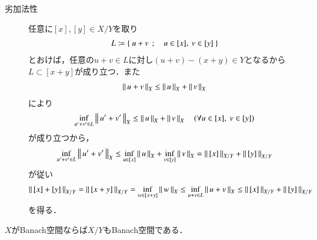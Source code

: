 \begin{prf}
\begin{description}
			\item[劣加法性]
				任意に$[x],[y] \in X/Y$を取り
				\begin{align}
					L \coloneqq \left\{\ u + v\ \, ; \quad u \in [x],\ v \in [y]\ \right\}
				\end{align}
				とおけば，任意の$u+v \in L$に対し$(u+v) - (x+y) \in Y$となるから$L \subset [x+y]$が成り立つ．また
				\begin{align}
					\left\|\, u + v\, \right\|_{X} \leq \left\|\, u\, \right\|_{X} + \left\|\, v\, \right\|_{X}
				\end{align}
				により
				\begin{align}
					\operatorname*{inf}_{u'+v' \in L} \left\|\, u' + v'\, \right\|_{X} \leq \left\|\, u\, \right\|_{X} + \left\|\, v\, \right\|_{X} \quad (\forall u \in [x],\ v \in [y])
				\end{align}
				が成り立つから，
				\begin{align}
					\operatorname*{inf}_{u'+v' \in L} \left\|\, u' + v'\, \right\|_{X} 
					\leq \operatorname*{inf}_{u \in [x]} \left\|\, u\, \right\|_{X} + \operatorname*{inf}_{v \in [y]} \left\|\, v\, \right\|_{X}
					= \left\|\, [x]\, \right\|_{X/Y} + \left\|\, [y]\, \right\|_{X/Y}
				\end{align}
				が従い
				\begin{align}
					\left\|\, [x] + [y]\, \right\|_{X/Y} = \left\|\, [x+y]\, \right\|_{X/Y} 
					= \operatorname*{inf}_{w \in [x+y]} \left\|\, w\, \right\|_{X} 
					\leq \operatorname*{inf}_{u+v \in L} \left\|\, u + v\, \right\|_{X}
					\leq \left\|\, [x]\, \right\|_{X/Y} + \left\|\, [y]\, \right\|_{X/Y}
				\end{align}
				を得る．
				\QED
		\end{description}
	\end{prf}
	
	\begin{screen}
		\begin{thm}[商空間の完備性]
			$X$がBanach空間ならば$X/Y$もBanach空間である．
			\label{thm:quotient_normed_space_Banach}
		\end{thm}
	\end{screen}
	
